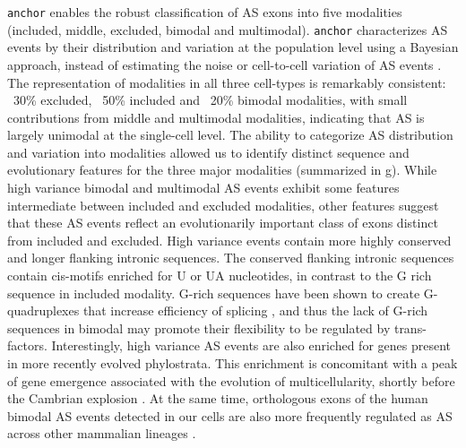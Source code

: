 \texttt{anchor} enables the robust classification of AS exons into five modalities (included, middle, excluded, bimodal and multimodal). \texttt{anchor} characterizes AS events by their distribution and variation at the population level using a Bayesian approach, instead of estimating the noise or cell-to-cell variation of AS events \cite{Marinov2014-iw}.  The representation of modalities in all three cell-types is remarkably consistent: ~30\% excluded, ~50\% included and ~20\% bimodal modalities, with small contributions from middle and multimodal modalities, indicating that AS is largely unimodal at the single-cell level. The ability to categorize AS distribution and variation into modalities allowed us to identify distinct sequence and evolutionary features for the three major modalities (summarized in g). While high variance bimodal and multimodal AS events exhibit some features intermediate between included and excluded modalities, other features suggest that these AS events reflect an evolutionarily important class of exons distinct from included and excluded. High variance events contain more highly conserved and longer flanking intronic sequences. The conserved flanking intronic sequences contain cis-motifs enriched for U or UA nucleotides, in contrast to the G rich sequence in included modality. G-rich sequences have been shown to create G-quadruplexes that increase efficiency of splicing \cite{Marcel2011-paperpile,Ribeiro2015-paperpile,Zizza2016-paperpile}, and thus the lack of G-rich sequences in bimodal may promote their flexibility to be regulated by trans-factors. Interestingly, high variance AS events are also enriched for genes present in more recently evolved phylostrata. This enrichment is concomitant with a peak of gene emergence associated with the evolution of multicellularity, shortly before the Cambrian explosion \cite{DomazetLoso:2008ba}. At the same time, orthologous exons of the human bimodal AS events detected in our cells are also more frequently regulated as AS across other mammalian lineages \cite{Merkin:2012hv,BarbosaMorais:2012crb}.

